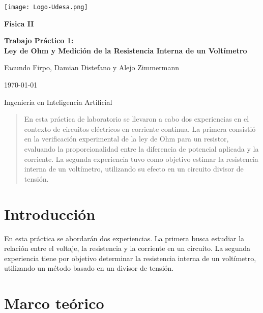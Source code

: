\documentclass[11pt]{article}
\begin{document}
\begin{titlepage}
    \centering
    \vspace*{0.5cm}
    \texttt{[image: Logo-Udesa.png]}\par
    \vspace{10pt}

    {\LARGE \textbf{Fisica II}\par}
    \vspace{1cm}

    {\LARGE \textbf{Trabajo Práctico 1: \\Ley de Ohm y Medición de la Resistencia Interna de un Voltímetro}\par}
    \vspace{2cm}
    
    {\LARGE {Facundo Firpo, Damian  Distefano y Alejo Zimmermann}\par}
    \vspace{4cm}
    
    {\Large \today\par}
    \vspace{1cm}
    \Large{Ingeniería en Inteligencia Artificial}
\end{titlepage}


\begin{abstract}
En esta práctica de laboratorio se llevaron a cabo dos experiencias en el contexto de circuitos eléctricos en corriente continua. La primera consistió en la verificación experimental de la ley de Ohm para un resistor, evaluando la proporcionalidad entre la diferencia de potencial aplicada y la corriente. La segunda experiencia tuvo como objetivo estimar la resistencia interna de un voltímetro, utilizando su efecto en un circuito divisor de tensión.
\end{abstract}

\section*{Introducción}

En esta práctica se abordarán dos experiencias. La primera busca estudiar la relación entre el voltaje, la resistencia y la corriente en un circuito. La segunda experiencia tiene por objetivo determinar la resistencia interna de un voltímetro, utilizando un método basado en un divisor de tensión.

\section*{Marco teórico}
\end{document}
